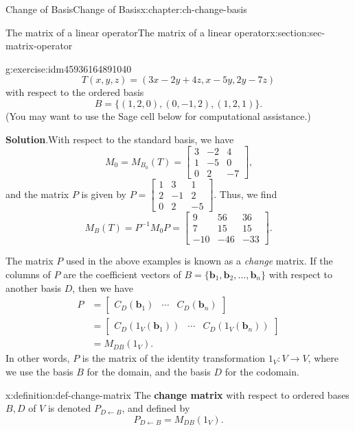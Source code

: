 \documentclass[oneside,10pt,]{book}
\newcommand{\blocktitlefont}{\relax}
\newcommand{\terminology}[1]{\textbf{#1}}
\numberwithin{equation}{section}
\newcommand{\bbm}{\begin{bmatrix}}
\newcommand{\ebm}{\end{bmatrix}}
\newcommand{\basis}[2]{\{\mathbf{#1}_1,\mathbf{#1}_2,\ldots,\mathbf{#1}_{#2}\}}
\newcommand{\amp}{&}
\begin{document}
\begin{chapterptx}{Change of Basis}{}{Change of Basis}{}{}{x:chapter:ch-change-basis}
\begin{sectionptx}{The matrix of a linear operator}{}{The matrix of a linear operator}{}{}{x:section:sec-matrix-operator}
\begin{inlineexercise}{}{g:exercise:idm45936164891040}
\begin{equation*}
T(x,y,z) = (3x-2y+4z,x-5y,2y-7z)
\end{equation*}
with respect to the ordered basis%
\begin{equation*}
B = \{(1,2,0),(0,-1,2),(1,2,1)\}\text{.}
\end{equation*}
(You may want to use the Sage cell below for computational assistance.)%
\par\smallskip%
\noindent\textbf{\blocktitlefont Solution}.\label{g:solution:idm45936164888592}{}\hypertarget{g:solution:idm45936164888592}{}\quad{}With respect to the standard basis, we have%
\begin{equation*}
M_0=M_{B_0}(T) = \bbm 3\amp -2\amp 4\\1\amp -5\amp 0\\0\amp 2\amp -7\ebm\text{,}
\end{equation*}
and the matrix \(P\) is given by \(P = \bbm 1\amp 3\amp 1\\2\amp -1\amp 2\\0\amp 2\amp-5\ebm\). Thus, we find%
\begin{equation*}
M_B(T)=P^{-1}M_0P=\bbm 9\amp 56\amp 36\\7\amp 15\amp 15\\-10\amp -46\amp -33\ebm\text{.}
\end{equation*}
%
\end{inlineexercise}%
The matrix \(P\) used in the above examples is known as a \emph{change} matrix. If the columns of \(P\) are the coefficient vectors of \(B=\basis{b}{n}\) with respect to another basis \(D\), then we have%
\begin{align*}
P \amp= \bbm C_D(\mathbf{b}_1)\amp\cdots \amp C_D(\mathbf{b}_n)\ebm\\
\amp = \bbm C_D(1_V(\mathbf{b}_1))\amp \cdots \amp C_D(1_V(\mathbf{b}_n))\ebm\\
\amp = M_{DB}(1_V)\text{.}
\end{align*}
In other words, \(P\) is the matrix of the identity transformation \(1_V:V\to V\), where we use the basis \(B\) for the domain, and the basis \(D\) for the codomain.%
\begin{definition}{}{x:definition:def-change-matrix}%
The \terminology{change matrix} with respect to ordered bases \(B,D\) of \(V\) is denoted \(P_{D\leftarrow B}\), and defined by%
\begin{equation*}
P_{D\leftarrow B} = M_{DB}(1_V)\text{.}
\end{equation*}
%
\end{definition}

\end{sectionptx}
\end{chapterptx}
\end{document}
